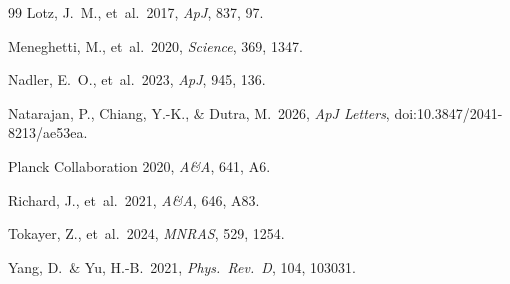 \documentclass[11pt,a4paper,openright]{book}
\theoremstyle{dm3thm}
\theoremstyle{dm3def}
\begin{document}
\begin{thebibliography}{99}
Lotz, J.~M., et~al.\ 2017, \textit{ApJ}, 837, 97.

Meneghetti, M., et~al.\ 2020, \textit{Science}, 369, 1347.

Nadler, E.~O., et~al.\ 2023, \textit{ApJ}, 945, 136.

Natarajan, P., Chiang, Y.-K., \& Dutra, M.\ 2026,
\textit{ApJ Letters}, doi:10.3847/2041-8213/ae53ea.

Planck Collaboration 2020, \textit{A\&A}, 641, A6.

Richard, J., et~al.\ 2021, \textit{A\&A}, 646, A83.

Tokayer, Z., et~al.\ 2024, \textit{MNRAS}, 529, 1254.

Yang, D.\ \& Yu, H.-B.\ 2021, \textit{Phys.\ Rev.\ D}, 104, 103031.

\end{thebibliography}
\end{document}
